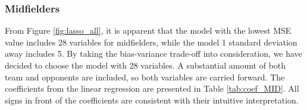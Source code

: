 \subsubsection{Midfielders}
From Figure \ref{fig:lasso_all}, it is apparent that the model with the lowest MSE value includes 28 variables for midfielders, while the model 1 standard deviation away includes 5. By taking the bias-variance trade-off into consideration, we have decided to choose the model with 28 variables. A substantial amount of both team and opponents are included, so both variables are carried forward. The coefficients from the linear regression are presented in Table \ref{tab:coef_MID}. All signs in front of the coefficients are consistent with their intuitive interpretation.

